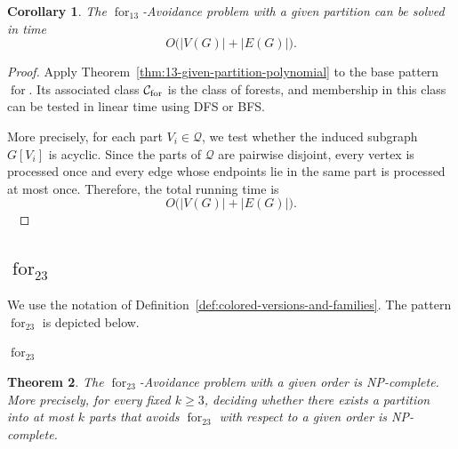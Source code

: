 \documentclass[12pt]{article}
\theoremstyle{plain}
\newtheorem{theorem}{Theorem}[section]
\newtheorem{corollary}[theorem]{Corollary}
\theoremstyle{definition}
\theoremstyle{remark}
\theoremstyle{definition}
\newcommand{\forlabel}{\mathrm{for}}
\DeclareRobustCommand{\forname}{%
  \ensuremath{\mathop{\forlabel}\nolimits}%
}
\DeclareRobustCommand{\forparam}[1]{%
  \ensuremath{\mathop{\forlabel}\nolimits_{#1}}%
}
\newcommand{\forst}{\forparam{23}}
\begin{document}
\begin{corollary}\label{cor:for13-given-partition-polynomial}
The \(\forparam{13}\)-Avoidance problem with a given partition can be solved in time
\[
O\bigl(|V(G)|+|E(G)|\bigr).
\]
\end{corollary}

\begin{proof}
Apply Theorem~\ref{thm:13-given-partition-polynomial} to the base pattern
\(\forname\). Its associated class \(\mathcal C_{\forname}\) is the class of
forests, and membership in this class can be tested in linear time using DFS
or BFS.

More precisely, for each part \(V_i\in\mathcal Q\), we test whether the induced
subgraph \(G[V_i]\) is acyclic. Since the parts of \(\mathcal Q\) are pairwise
disjoint, every vertex is processed once and every edge whose endpoints lie in
the same part is processed at most once. Therefore, the total running time is
\[
O\bigl(|V(G)|+|E(G)|\bigr).
\]
\
\end{proof}





\subsection{\texorpdfstring{\(\forparam{23}\)}{for23}}
\label{subsec:for23}

We use the notation of
Definition~\ref{def:colored-versions-and-families}.
The pattern \(\forparam{23}\) is depicted below.

\begin{center}

\smallskip
\(\forparam{23}\)
\end{center}





\begin{theorem}\label{thm:forst-given-order-np-complete}
The \(\forst\)-Avoidance problem with a given order is NP-complete.
More precisely, for every fixed \(k\ge 3\), deciding whether there exists a partition into at most \(k\) parts
that avoids \(\forst\) with respect to a given order is NP-complete.
\end{theorem}
\end{document}
